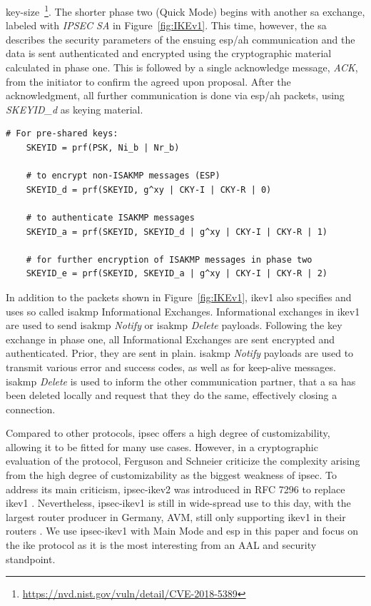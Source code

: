 key-size~\footnote{\url{https://nvd.nist.gov/vuln/detail/CVE-2018-5389}}. The shorter phase two (Quick Mode) begins with another \ac{sa} exchange, labeled with \emph{IPSEC SA} in Figure~\ref{fig:IKEv1}. This time, however, the \ac{sa} describes the security parameters of the ensuing \ac{esp}/\ac{ah} communication and the data is sent authenticated and encrypted using the cryptographic material calculated in phase one. This is followed by a single acknowledge message, \emph{ACK}, from the initiator to confirm the agreed upon proposal. After the acknowledgment, all further communication is done via \ac{esp}/\ac{ah} packets, using \emph{SKEYID\_d} as keying material.

\begin{lstlisting}[float=ht, caption=IKE Keying, label=lst:keying]
	# For pre-shared keys: 
	SKEYID = prf(PSK, Ni_b | Nr_b)
	
	# to encrypt non-ISAKMP messages (ESP)
	SKEYID_d = prf(SKEYID, g^xy | CKY-I | CKY-R | 0)
	
	# to authenticate ISAKMP messages
	SKEYID_a = prf(SKEYID, SKEYID_d | g^xy | CKY-I | CKY-R | 1)
	
	# for further encryption of ISAKMP messages in phase two
	SKEYID_e = prf(SKEYID, SKEYID_a | g^xy | CKY-I | CKY-R | 2)
\end{lstlisting}

In addition to the packets shown in Figure~\ref{fig:IKEv1}, \ac{ike}v1 also specifies and uses so called \ac{isakmp} Informational Exchanges. Informational exchanges in \ac{ike}v1 are used to send \ac{isakmp} \emph{Notify} or \ac{isakmp} \emph{Delete} payloads. Following the key exchange in phase one, all Informational Exchanges are sent encrypted and authenticated. Prior, they are sent in plain. \ac{isakmp} \emph{Notify} payloads are used to transmit various error and success codes, as well as for keep-alive messages. \ac{isakmp} \emph{Delete} is used to inform the other communication partner, that a \ac{sa} has been deleted locally and request that they do the same, effectively closing a connection. 

Compared to other protocols, \ac{ipsec} offers a high degree of customizability, allowing it to be fitted for many use cases. However, in a cryptographic evaluation of the protocol, Ferguson and Schneier \textcite{ferguson1999cryptographic} criticize the complexity arising from the high degree of customizability as the biggest weakness of \ac{ipsec}. To address its main criticism, \ac{ipsec}-\ac{ike}v2 was introduced in RFC 7296 to replace \ac{ike}v1 \cite{kaufman2014internet}. Nevertheless, \ac{ipsec}-\ac{ike}v1 is still in wide-spread use to this day, with the largest router producer in Germany, AVM, still only supporting \ac{ike}v1 in their routers \cite{avm2022}. We use \ac{ipsec}-\ac{ike}v1 with Main Mode and \ac{esp} in this paper and focus on the \ac{ike} protocol as it is the most interesting from an AAL and security standpoint. %
